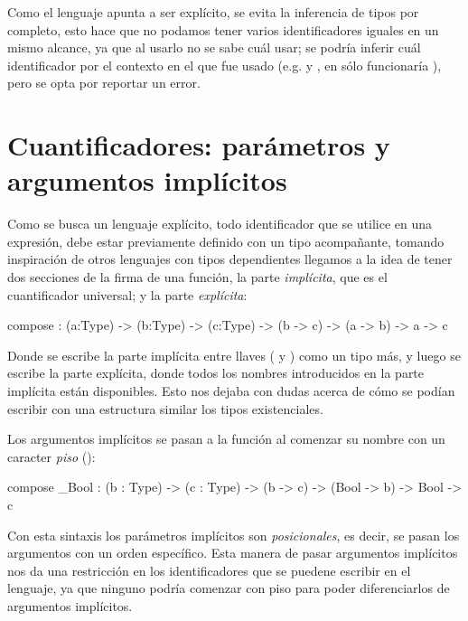 {\begin{designfr}
Como el lenguaje apunta a ser explícito, se evita la inferencia de tipos por completo, esto hace que no podamos tener varios identificadores iguales en un mismo alcance, ya que al usarlo no se sabe cuál usar; se podría inferir cuál identificador por el contexto en el que fue usado (e.g.  y , en  sólo funcionaría ), pero se opta por reportar un error.
\end{designfr}

\section{Cuantificadores: parámetros y argumentos implícitos}

\begin{designfr}
Como se busca un lenguaje explícito, todo identificador que se utilice en una expresión, debe estar previamente definido con un tipo acompañante, tomando inspiración de otros lenguajes con tipos dependientes llegamos a la idea de tener dos secciones de la firma de una función, la parte \emph{implícita}, que es el cuantificador universal; y la parte \emph{explícita}:

\begin{anglercode}
compose : { (a:Type) -> (b:Type) -> (c:Type) } -> (b -> c) -> (a -> b) -> a -> c
\end{anglercode}

Donde se escribe la parte implícita entre llaves (\inlinecode{\{} y \inlinecode{\}}) como un tipo más, y luego se escribe la parte explícita, donde todos los nombres introducidos en la parte implícita están disponibles. Esto nos dejaba con dudas acerca de cómo se podían escribir con una estructura similar los tipos existenciales.

Los argumentos implícitos se pasan a la función al comenzar su nombre con un caracter \emph{piso} (\inlinecode{\_}):

\begin{anglercode}
compose _Bool : { (b : Type) -> (c : Type) } -> (b -> c) -> (Bool -> b) -> Bool -> c
\end{anglercode}

Con esta sintaxis los parámetros implícitos son \emph{posicionales}, es decir, se pasan los argumentos con un orden específico. Esta manera de pasar argumentos implícitos nos da una restricción en los identificadores que se puedene escribir en el lenguaje, ya que ninguno podría comenzar con piso para poder diferenciarlos de argumentos implícitos.


\end{designfr}}
